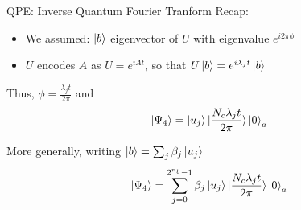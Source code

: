 \begin{frame}{QPE: Inverse Quantum Fourier Tranform}
    Recap:
    \begin{itemize}
        \item We assumed: $\ket{b}$ eigenvector of $U$ with eigenvalue $e^{i2\pi \phi}$
        \item $U$ encodes $A$ as $U = e^{iAt}$, so that $U\ket{b} = e^{i\lambda_j t} \ket{b}$
    \end{itemize}

    \vspace{0.2cm}
    Thus, $ \phi = \frac{\lambda_j t}{2\pi}$ and
    \begin{equation*}
        \ket{\Psi_4} = \ket{u_j}\ket{\frac{N_c \lambda_j t}{2\pi}}\ket{0}_a
    \end{equation*}

    More generally, writing $\ket{b} = \sum_j \beta_j \ket{u_j}$ 
    \begin{equation*}
        \ket{\Psi_4} = \sum_{j=0}^{2^{n_b}-1} \beta_j\ket{u_j} \ket{\frac{N_c\lambda_j t}{2\pi}}\ket{0}_a
    \end{equation*} 
\end{frame}


